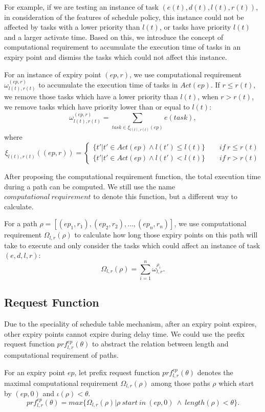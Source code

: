 \documentclass[sigconf]{acmart}
\begin{document}
For example, if we are testing an instance of task $(e(t),d(t),l(t),r(t))$, in consideration of the features of schedule policy, this instance could not be affected by tasks with a lower priority than $l(t)$, or tasks have priority $l(t)$ and a larger activate time. Based on this, we introduce the concept of computational requirement to accumulate the execution time of tasks in an expiry point and dismiss the tasks which could not affect this instance.
\begin{definition}
For an instance of expiry point $(ep,r)$, we use computational requirement $\omega_{l(t),r(t)}^{(ep,r)}$ to accumulate the execution time of tasks in $Act(ep)$. If $r\leq r(t)$, we remove those tasks which have a lower priority than $l(t)$, when $r>r(t)$, we remove tasks which have priority lower than or equal to $l(t)$:
\begin{equation}
\omega_{l(t),r(t)}^{(ep,r)}=\sum\limits_{task\in \xi_{l(t),r(t)}(ep)}e(task),
\end{equation}\label{equation_loweromega}
where 
\[
\xi_{l(t),r(t)}((ep,r))=\begin{cases}\{t'|t'\in Act(ep)\wedge l(t')\leq l(t)\}\qquad if\ r\leq r(t)\\
\{t'|t'\in Act(ep)\wedge l(t')<l(t)\}\qquad if\ r>r(t)
\end{cases}\]
\end{definition}
After proposing the computational requirement function, the total execution time during a path can be computed. We still use the name $computational\ requirement$ to denote this function, but a different way to calculate.
\begin{definition}
For a path $\rho=[(ep_1,r_1),(ep_2,r_2),\dots,(ep_n,r_n)]$, we use computational requirement $\Omega_{l,r}(\rho)$ to calculate how long those expiry points on this path will take to execute and only consider the tasks which could affect an instance of task $(e,d,l,r)$:
\begin{equation}
\Omega_{l,r}(\rho)=\sum_{i=1}^n\omega_{l,r}^{\rho_i}.
\end{equation}\label{equation_higheromega}
\end{definition}

\subsection{Request Function}\label{section_prf}
Due to the speciality of schedule table mechanism, after an expiry point expires, other expiry points cannot expire during delay time. We could use the prefix request function \cite{DBLP:journals/rts/Stigge015a} $prf^{ep}_{l,r}(\theta)$ to abstract the relation between length and computational requirement of paths.
\begin{definition}
For an expiry point $ep$, let prefix request function $prf^{ep}_{l,r}(\theta)$ denotes the maximal computational requirement $\Omega_{l,r}(\rho)$ among those paths $\rho$ which start by $(ep,0)$ and $\iota(\rho)<\theta$.
\begin{equation}
prf^{ep}_{l,r}(\theta)=max\{\Omega_{l,r}(\rho)|\rho \ start\ in\ (ep,0)\ \wedge\ length(\rho)<\theta\}.
\end{equation}\label{equation_prf}
\end{definition}
\end{document}
